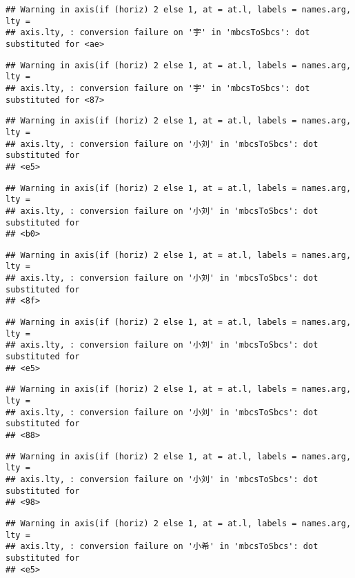 \documentclass[
]{article}
\begin{document}
\begin{verbatim}
## Warning in axis(if (horiz) 2 else 1, at = at.l, labels = names.arg, lty =
## axis.lty, : conversion failure on '宇' in 'mbcsToSbcs': dot substituted for <ae>
\end{verbatim}

\begin{verbatim}
## Warning in axis(if (horiz) 2 else 1, at = at.l, labels = names.arg, lty =
## axis.lty, : conversion failure on '宇' in 'mbcsToSbcs': dot substituted for <87>
\end{verbatim}

\begin{verbatim}
## Warning in axis(if (horiz) 2 else 1, at = at.l, labels = names.arg, lty =
## axis.lty, : conversion failure on '小刘' in 'mbcsToSbcs': dot substituted for
## <e5>
\end{verbatim}

\begin{verbatim}
## Warning in axis(if (horiz) 2 else 1, at = at.l, labels = names.arg, lty =
## axis.lty, : conversion failure on '小刘' in 'mbcsToSbcs': dot substituted for
## <b0>
\end{verbatim}

\begin{verbatim}
## Warning in axis(if (horiz) 2 else 1, at = at.l, labels = names.arg, lty =
## axis.lty, : conversion failure on '小刘' in 'mbcsToSbcs': dot substituted for
## <8f>
\end{verbatim}

\begin{verbatim}
## Warning in axis(if (horiz) 2 else 1, at = at.l, labels = names.arg, lty =
## axis.lty, : conversion failure on '小刘' in 'mbcsToSbcs': dot substituted for
## <e5>
\end{verbatim}

\begin{verbatim}
## Warning in axis(if (horiz) 2 else 1, at = at.l, labels = names.arg, lty =
## axis.lty, : conversion failure on '小刘' in 'mbcsToSbcs': dot substituted for
## <88>
\end{verbatim}

\begin{verbatim}
## Warning in axis(if (horiz) 2 else 1, at = at.l, labels = names.arg, lty =
## axis.lty, : conversion failure on '小刘' in 'mbcsToSbcs': dot substituted for
## <98>
\end{verbatim}

\begin{verbatim}
## Warning in axis(if (horiz) 2 else 1, at = at.l, labels = names.arg, lty =
## axis.lty, : conversion failure on '小希' in 'mbcsToSbcs': dot substituted for
## <e5>
\end{verbatim}
\end{document}
